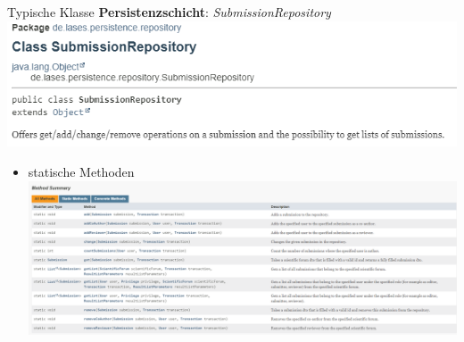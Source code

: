 \documentclass{beamer}
\begin{document}
    \begin{frame}{Typische Klasse \textbf{Persistenzschicht}:}
        \emph{SubmissionRepository}
        \centering
        \includegraphics[height=1.1\textheight]{graphics/repo/doc_repo}
        \pause
        \begin{itemize}
            \item statische Methoden
            \centering
            \includegraphics[height=1.1\textheight]{graphics/repo/doc_static}


\end{itemize}
\end{frame}
\end{document}

